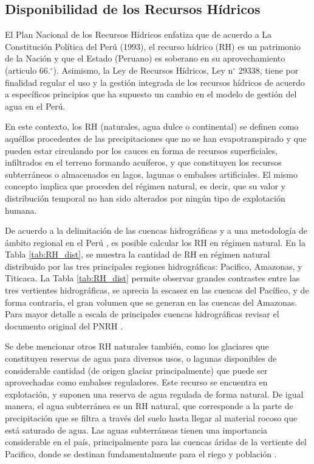 \documentclass[12pt]{article}
\begin{document}
\subsection{Disponibilidad de los Recursos Hídricos}

El Plan Nacional de los Recursos Hídricos \citep[PNRH;][]{PNRH2013} enfatiza que de acuerdo a La Constitución Política del Perú (1993), el recurso hídrico (RH) es un patrimonio de la Nación y que el Estado (Peruano) es soberano en su aprovechamiento (articulo 66.$^{\circ}$). Asimismo, la Ley de Recursos Hídricos, Ley n$^{\circ}$ 29338, tiene por finalidad regular el uso y la gestión integrada de los recursos hídricos de acuerdo a específicos principios que ha supuesto un cambio en el modelo de gestión del agua en el Perú. 

En este contexto, los RH (naturales, agua dulce o continental) se definen como aquéllos procedentes de las precipitaciones que no se han evapotranspirado y que pueden estar circulando por los cauces en forma de recursos superficiales, infiltrados en el terreno formando acuíferos, y que constituyen los recursos subterráneos o almacenados en lagos, lagunas o embalses artificiales. El mismo concepto implica que proceden del régimen natural, es decir, que su valor y distribución temporal no han sido alterados por ningún tipo de explotación humana.

De acuerdo a la delimitación de las cuencas hidrográficas y a una metodología de ámbito regional en el Perú \citep{PNRH2013}, es posible calcular los RH en régimen natural. En la Tabla \ref{tab:RH_dist}, se muestra la cantidad de RH en régimen natural distribuido por las tres principales regiones hidrográficas: Pacifico, Amazonas, y Titicaca. La Tabla \ref{tab:RH_dist} permite observar grandes contrastes entre las tres vertientes hidrográficas, se aprecia la escasez en las cuencas del Pacífico, y de forma contraria, el gran volumen que se generan en las cuencas del Amazonas. Para mayor detalle a escala de principales cuencas hidrográficas revisar el documento original del PNRH \citep{PNRH2013}.



Se debe mencionar otros RH naturales también, como los glaciares que constituyen reservas de agua para diversos usos, o lagunas disponibles de considerable cantidad (de origen glaciar principalmente) que puede ser aprovechadas como embalses reguladores. Este recurso se encuentra en explotación, y suponen una reserva de agua regulada de forma natural. De igual manera, el agua subterránea es un RH natural, que corresponde a la parte de precipitación que se filtra a través del suelo hasta llegar al material rocoso que está saturado de agua. Las aguas subterráneas tienen una importancia considerable en el país, principalmente para las cuencas áridas de la vertiente del Pacifico, donde se destinan fundamentalmente para el riego y población \citep{PNRH2013}. 
\end{document}
